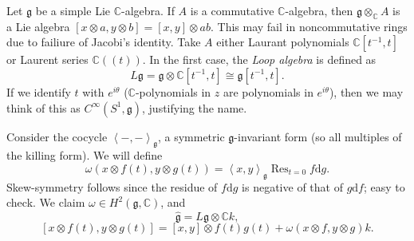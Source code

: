 \begin{example}
	Let $\mathfrak{g} $ be a simple Lie $\mathbb{C} $-algebra. If $A$ is a commutative $\mathbb{C} $-algebra, then $\mathfrak{g} \otimes _\mathbb{C} A$ is a Lie algebra $[x\otimes a,y\otimes b]=[x,y]\otimes ab$. This may fail in noncommutative rings due to failiure of Jacobi's identity. Take $A$ either Laurant polynomials $\mathbb{C} [t^{-1} ,t]$ or Laurent series $\mathbb{C} ((t))$. In the first case, the \emph{Loop algebra} is defined as
	\[
		L\mathfrak{g} =\mathfrak{g} \otimes \mathbb{C} [t^{-1} ,t]\cong \mathfrak{g} [t^{-1} ,t]
	.\]
	If we identify $t$ with $e^{i\theta } $ ($\mathbb{C} $-polynomials in $z$ are polynomials in $e^{i\theta } $), then we may think of this as $C^\infty (S^1,\mathfrak{g} )$, justifying the name.

	Consider the cocycle $\left\langle -,- \right\rangle _{\mathfrak{g} } $, a symmetric $\mathfrak{g} $-invariant form (so all multiples of the killing form). We will define
	\[
		\omega (x\otimes f(t),y\otimes g(t))=\left\langle x,y \right\rangle_\mathfrak{g} \operatorname{Res}_{t=0} f\mathrm{d} g
	.\]
	Skew-symmetry follows since the residue of $f\mathrm{d} g$ is negative of that of $g\mathrm{d} f$; easy to check. We claim $\omega \in H^2(\mathfrak{g} ,\mathbb{C} )$, and
	\[
		\hat{\mathfrak{g} }=L\mathfrak{g} \otimes \mathbb{C} k,
	\]
	\[
		[x\otimes f(t),y\otimes g(t)]=[x,y]\otimes f(t)g(t)+\omega (x\otimes f,y\otimes g)k
	.\]
\end{example}

